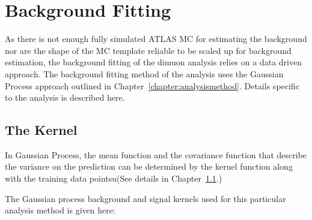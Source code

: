 \section{Background Fitting}
As there is not enough fully simulated ATLAS MC for estimating the background nor are the shape of the MC template reliable to be scaled up for background estimation, the background fitting of the dimuon analysis relies on a data driven approach. The background fitting method of the analysis uses the Gaussian Process approach outlined in Chapter~\ref{chapter:analysismethod}. Details specific to the analysis is described here.

\subsection{The Kernel}
In Gaussian Process, the mean function and the covariance function that describe the variance on the prediction can be determined by the kernel function along with the training data pointsu(See details in Chapter~\ref{}.)

The Gaussian process background and signal kernels used for this particular analysis method is given here:

